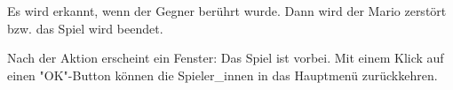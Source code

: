 Es wird erkannt, wenn der Gegner berührt wurde. Dann wird der Mario zerstört bzw. das Spiel wird beendet.  

Nach der Aktion erscheint ein Fenster: Das Spiel ist vorbei. Mit einem Klick auf einen "OK"-Button können die Spieler\_innen in das Hauptmenü zurückkehren.